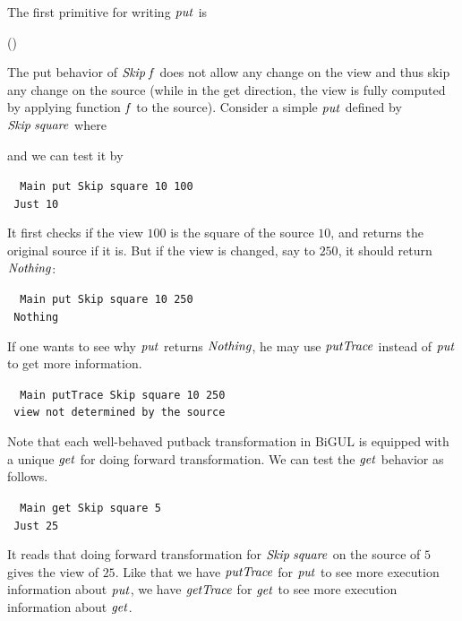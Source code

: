 The first primitive for writing \ensuremath{\Varid{put}} is
\begin{hscode}\SaveRestoreHook
{}%
%
%
%
\>[3]{}\<[12]%
\>[12]{}\mathbin{::}(\to {})\to {}\;\;\<[E]%
\ColumnHook
\end{hscode}\resethooks
The put behavior of \ensuremath{\Conid{Skip}\;\Varid{f}} does not allow any change on the view
and thus skip any change on the source
(while in the get direction, the view is fully computed by
applying function \ensuremath{\Varid{f}} to the source). Consider a simple \ensuremath{\Varid{put}} defined by
\ensuremath{\Conid{Skip}\;\Varid{square}} where
\begin{hscode}\SaveRestoreHook
{}%
%
\>[B]{}\;\mathrel{=}\mathbin{*}\<[E]%
\ColumnHook
\end{hscode}\resethooks
and we can test it by
\begin{tabbing}\tt
~Main~put~Skip~square~10~100\\
\tt ~Just~10
\end{tabbing}
It first checks if the view \ensuremath{\mathrm{100}} is the square of the source \ensuremath{\mathrm{10}}, and returns
the original source if it is. But if the view is changed, say to \ensuremath{\mathrm{250}},
it should return \ensuremath{\Conid{Nothing}}:
\begin{tabbing}\tt
~Main~put~Skip~square~10~250\\
\tt ~Nothing
\end{tabbing}
If one wants to see why \ensuremath{\Varid{put}} returns \ensuremath{\Conid{Nothing}}, he may use
\ensuremath{\Varid{putTrace}} instead of \ensuremath{\Varid{put}} to get more information.
\begin{tabbing}\tt
~Main~putTrace~Skip~square~10~250\\
\tt ~view~not~determined~by~the~source
\end{tabbing}

Note that each well-behaved putback transformation in BiGUL
is equipped with a unique \ensuremath{\Varid{get}} for doing forward transformation.
We can test the \ensuremath{\Varid{get}} behavior as follows.
\begin{tabbing}\tt
~Main~get~Skip~square~5\\
\tt ~Just~25
\end{tabbing}
It reads that doing forward transformation for \ensuremath{\Conid{Skip}\;\Varid{square}} on the
source of \ensuremath{\mathrm{5}} gives the view of \ensuremath{\mathrm{25}}. Like that we have \ensuremath{\Varid{putTrace}} for \ensuremath{\Varid{put}}
to see more execution information about \ensuremath{\Varid{put}},
we have \ensuremath{\Varid{getTrace}} for \ensuremath{\Varid{get}} to see  more execution information about \ensuremath{\Varid{get}}.

